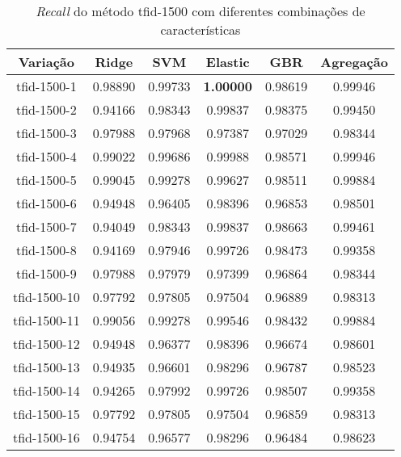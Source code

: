 \begin{table}[H]
\label{tab:recalltfid1500}
\centering
\begin{tabular}{|c| c c  c  c  c| }
\hline
Variação &  Ridge & SVM & Elastic & GBR & Agregação  \\ 
\hline
tfid-1500-1 & 0.98890 & 0.99733 & \textbf{1.00000} & 0.98619 & 0.99946 \\
\hline
tfid-1500-2 & 0.94166 & 0.98343 & 0.99837 & 0.98375 & 0.99450 \\
\hline
tfid-1500-3 & 0.97988 & 0.97968 & 0.97387 & 0.97029 & 0.98344 \\
\hline
tfid-1500-4 & 0.99022 & 0.99686 & 0.99988 & 0.98571 & 0.99946 \\
\hline
tfid-1500-5 & 0.99045 & 0.99278 & 0.99627 & 0.98511 & 0.99884 \\
\hline
tfid-1500-6 & 0.94948 & 0.96405 & 0.98396 & 0.96853 & 0.98501 \\
\hline
tfid-1500-7 & 0.94049 & 0.98343 & 0.99837 & 0.98663 & 0.99461 \\
\hline
tfid-1500-8 & 0.94169 & 0.97946 & 0.99726 & 0.98473 & 0.99358 \\
\hline
tfid-1500-9 & 0.97988 & 0.97979 & 0.97399 & 0.96864 & 0.98344 \\
\hline
tfid-1500-10 & 0.97792 & 0.97805 & 0.97504 & 0.96889 & 0.98313 \\
\hline
tfid-1500-11 & 0.99056 & 0.99278 & 0.99546 & 0.98432 & 0.99884 \\
\hline
tfid-1500-12 & 0.94948 & 0.96377 & 0.98396 & 0.96674 & 0.98601 \\
\hline
tfid-1500-13 & 0.94935 & 0.96601 & 0.98296 & 0.96787 & 0.98523 \\
\hline
tfid-1500-14 & 0.94265 & 0.97992 & 0.99726 & 0.98507 & 0.99358 \\
\hline
tfid-1500-15 & 0.97792 & 0.97805 & 0.97504 & 0.96859 & 0.98313 \\
\hline
tfid-1500-16 & 0.94754 & 0.96577 & 0.98296 & 0.96484 & 0.98623 \\
\hline
\end{tabular}
\caption{\textit{Recall} do método tfid-1500 com diferentes combinações de características}
\end{table}

